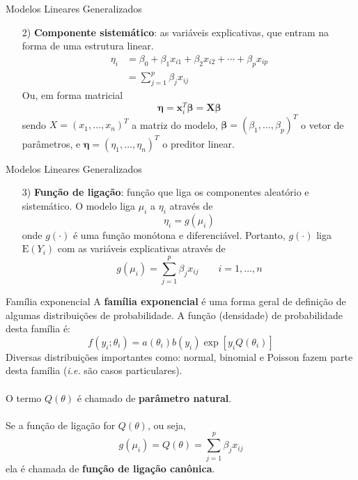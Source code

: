 \documentclass[10pt]{beamer}\usepackage[]{graphicx}\usepackage[]{color}
\providecommand{\ie}{\textit{i.e.}\xspace}
\newcommand{\mb}[1]{\mathbf{#1}}
\newcommand{\bs}[1]{\boldsymbol{#1}}
\providecommand{\E}{\text{E}}
\theoremstyle{definition}
\begin{document}
\begin{frame}[fragile]{Modelos Lineares Generalizados}
  \begin{enumerate}
  \item[2)] \textbf{Componente sistemático}: as variáveis explicativas,
    que entram na forma de uma estrutura linear.
    \begin{align*}
      \eta_i &= \beta_0 + \beta_1 x_{i1} + \beta_2 x_{i2} + \cdots +
               \beta_p x_{ip} \\
             &= \sum_{j=1}^{p} \beta_j x_{ij}
    \end{align*}
    Ou, em forma matricial
    \begin{equation*}
      \bs{\eta} = \mb{x}_{i}^{T} \bs{\beta} = \mb{X}\bs{\beta}
    \end{equation*}
    sendo $X = (x_1, \ldots, x_n)^{T}$ a matriz do modelo, $\bs{\beta} =
    (\beta_1, \ldots, \beta_p)^{T}$ o vetor de parâmetros, e $\bs{\eta} =
    (\eta_1, \ldots, \eta_n)^{T}$ o preditor linear.
  \end{enumerate}
\end{frame}

\begin{frame}[fragile]{Modelos Lineares Generalizados}
  \begin{enumerate}
  \item[3)] \textbf{Função de ligação}: função que liga os componentes
    aleatório e sistemático. O modelo liga $\mu_i$ a $\eta_i$ através de
    \begin{equation*}
      \eta_i = g(\mu_i)
    \end{equation*}
    onde $g(\cdot)$ é uma função monótona e diferenciável. Portanto,
    $g(\cdot)$ liga $\E(Y_i)$ com as variáveis explicativas através de
    \begin{equation*}
      g(\mu_i) = \sum_{j=1}^{p} \beta_j x_{ij} \qquad i = 1, \ldots, n
    \end{equation*}
  \end{enumerate}
\end{frame}

\begin{frame}[fragile]{Família exponencial}
  A \textbf{família exponencial} é uma forma geral de definição de
  algumas distribuições de probabilidade. A função (densidade) de
  probabilidade desta família é:
  \begin{equation*}
    f(y_i; \theta_i) = a(\theta_i) b(y_i) \exp{[y_i Q(\theta_i)]}
  \end{equation*}
  Diversas distribuições importantes como: normal, binomial e Poisson
  fazem parte desta família (\ie são casos particulares). \\~\\
  O termo $Q(\theta)$ é chamado de \textbf{parâmetro natural}. \\~\\
  Se a função de ligação for $Q(\theta)$, ou seja,
  \begin{equation*}
    g(\mu_i) = Q(\theta) = \sum_{j=1}^{p} \beta_j x_{ij}
  \end{equation*}
  ela é chamada de \textbf{função de ligação canônica}.
\end{frame}
\end{document}
